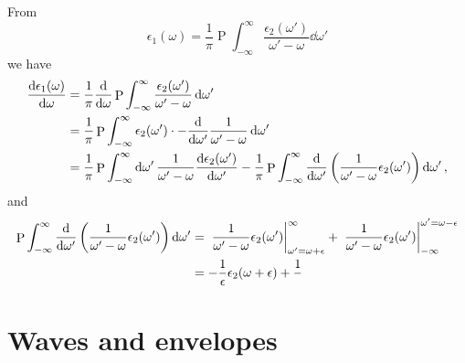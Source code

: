 \documentclass[hyperref, a4paper]{article}
\DeclareMathOperator{\primevalue}{P}
\begin{document}
From 
\begin{equation}
    \epsilon_1(\omega) = \frac{1}{\pi} \primevalue \int_{-\infty}^{\infty} \frac{
            \epsilon_2(\omega')
        }{
            \omega' - \omega
        } \dd{\omega'} 
\end{equation}
we have 
\begin{equation}
    \begin{aligned}
        \dv{\epsilon_1(\omega)}{\omega}
        &= \frac{1}{\pi} \dv{\omega} \primevalue \int_{-\infty}^{\infty} \frac{
            \epsilon_2(\omega')
        }{
            \omega' - \omega
        } \dd{\omega'} \\
        &= \frac{1}{\pi}  \primevalue \int_{-\infty}^{\infty} \epsilon_2(\omega')
        \cdot -\dv{\omega'} \frac{1}{\omega' - \omega} \dd{\omega'} \\
        &= \frac{1}{\pi} \primevalue \int_{-\infty}^{\infty} \dd{\omega'}
        \frac{1}{\omega' - \omega} \dv{\epsilon_2(\omega')}{\omega'}
        - \frac{1}{\pi} \primevalue \int_{-\infty}^{\infty} 
        \dv{\omega'} \left(
            \frac{1}{\omega' - \omega} \epsilon_2(\omega')
        \right) \dd{\omega'},
    \end{aligned}
\end{equation}
and 
\begin{equation}
    \begin{aligned}
        \primevalue \int_{-\infty}^{\infty} 
        \dv{\omega'} \left(
            \frac{1}{\omega' - \omega} \epsilon_2(\omega')
        \right) \dd{\omega'} &= 
        \eval*{
            \frac{1}{\omega' - \omega} \epsilon_2(\omega')
        }_{\omega' = \omega + \epsilon}^{\infty}    
        + \eval*{
            \frac{1}{\omega' - \omega} \epsilon_2(\omega')
        }^{\omega' = \omega - \epsilon}_{-\infty}     \\
        &= - \frac{1}{\epsilon} \epsilon_2(\omega + \epsilon)
        + \frac{1}{}
    \end{aligned}
\end{equation}

\section{Waves and envelopes}
\end{document}
